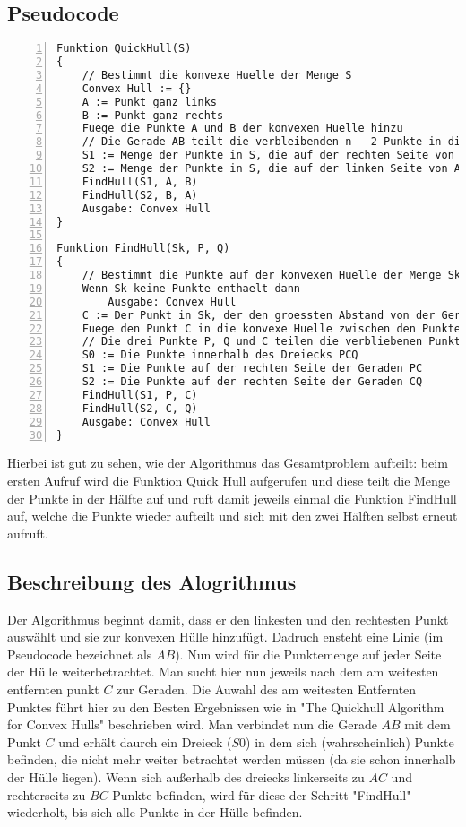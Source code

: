 \documentclass[Labor, MSC, german]{twbook}
\begin{document}
\subsection{Pseudocode}
\begin{lstlisting}[language=PseudoCode,numbers=left, breaklines=true, caption={Quick Hull Pseudocode \cite{Wikipedia_QuickHull}}]
Funktion QuickHull(S)
{
    // Bestimmt die konvexe Huelle der Menge S
    Convex Hull := {} 
    A := Punkt ganz links
    B := Punkt ganz rechts
    Fuege die Punkte A und B der konvexen Huelle hinzu
    // Die Gerade AB teilt die verbleibenden n - 2 Punkte in die Teilmengen S1 und S2
    S1 := Menge der Punkte in S, die auf der rechten Seite von AB sind
    S2 := Menge der Punkte in S, die auf der linken Seite von AB sind
    FindHull(S1, A, B)
    FindHull(S2, B, A)
    Ausgabe: Convex Hull
}

Funktion FindHull(Sk, P, Q)
{
    // Bestimmt die Punkte auf der konvexen Huelle der Menge Sk, die auf der rechten Seite der Geraden PQ sind
    Wenn Sk keine Punkte enthaelt dann
        Ausgabe: Convex Hull
    C := Der Punkt in Sk, der den groessten Abstand von der Geraden PQ hat
    Fuege den Punkt C in die konvexe Huelle zwischen den Punkten P und Q ein
    // Die drei Punkte P, Q und C teilen die verbliebenen Punkte von Sk in die Teilmengen S0, S1 und S2
    S0 := Die Punkte innerhalb des Dreiecks PCQ
    S1 := Die Punkte auf der rechten Seite der Geraden PC
    S2 := Die Punkte auf der rechten Seite der Geraden CQ
    FindHull(S1, P, C)
    FindHull(S2, C, Q)
    Ausgabe: Convex Hull
}
\end{lstlisting}
Hierbei ist gut zu sehen, wie der Algorithmus das Gesamtproblem aufteilt: beim ersten Aufruf wird die Funktion Quick Hull aufgerufen und diese teilt die Menge der Punkte in der Hälfte auf und ruft damit jeweils einmal die Funktion FindHull auf, welche die Punkte wieder aufteilt und sich mit den zwei Hälften selbst erneut aufruft.
\subsection{Beschreibung des Alogrithmus}
Der Algorithmus beginnt damit, dass er den linkesten und den rechtesten Punkt auswählt und sie zur konvexen Hülle hinzufügt. Dadruch ensteht eine Linie (im Pseudocode bezeichnet als $AB$). Nun wird für die Punktemenge auf jeder Seite der Hülle weiterbetrachtet. Man sucht hier nun jeweils nach dem am weitesten entfernten punkt $C$ zur Geraden. Die Auwahl des am weitesten Entfernten Punktes führt hier zu den Besten Ergebnissen wie in "The Quickhull Algorithm for Convex Hulls"\cite{10.1145/235815.235821} beschrieben wird. Man verbindet nun die Gerade $AB$ mit dem Punkt $C$ und erhält daurch ein Dreieck ($S0$) in dem sich (wahrscheinlich) Punkte befinden, die nicht mehr weiter betrachtet werden müssen (da sie schon innerhalb der Hülle liegen). Wenn sich außerhalb des dreiecks linkerseits zu $AC$ und rechterseits zu $BC$ Punkte befinden, wird für diese der Schritt "FindHull" wiederholt, bis sich alle Punkte in der Hülle befinden.
\end{document}
